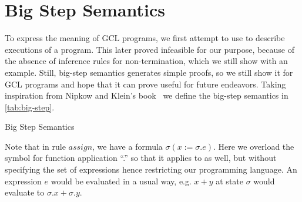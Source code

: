 \section{Big Step Semantics}\label{sec:big-step}
To express the meaning of GCL programs, we first attempt to use  to describe executions of a program. 
This later proved infeasible for our purpose, because of the absence of inference rules for non-termination, which we still show with an example. 
Still, big-step semantics generates simple proofs, so we still show it for GCL programs and hope that it can prove useful for future endeavors.
Taking inspiration from Nipkow and Klein's book~\cite{nipkow2014} we define the big-step semantics in \autoref{tab:big-step}. 

\newcommand\ddfrac[2]{\frac{\displaystyle #1}{\displaystyle #2}}
\begin{table}[t]
  \normalsize
  \centering
  \caption{Big Step Semantics}
  \label{tab:big-step}
\end{table}

Note that in rule $assign$, we have a formula $\sigma(x:=\sigma.e)$. 
Here we overload the symbol for function application ``.'' so that it applies to  as well, but without specifying the set of expressions hence restricting our programming language. 
An expression $e$ would be evaluated in a usual way, e.g. $x+y$ at state $\sigma$ would evaluate to $\sigma.x + \sigma.y$. 

